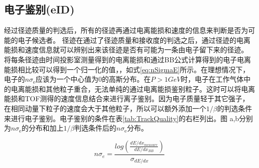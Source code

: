 \subsection{电子鉴别(eID)}
\label{ch:eID}
经过径迹质量的判选后，所有的径迹再通过电离能损和速度的信息来判断是否为可能的电子候选者。
径迹在通过了径迹质量和接收度的判选之后，通过径迹的电离能损和速度信息就可以辨别出来该径迹是否有可能为一条由电子留下来的径迹。
将每条径迹由时间投影室测量得到的电离能损和通过BB公式计算得到的电子电离能损相比较可以得到一个归一化的值，\nSigmaE ，如式\ref{eq:nSigmaE}所示。在理想情况下，电子的$n\sigma_\mathrm{e}$应该为一个中心值为0的高斯分布。在$P > 1 GeV$时，电子在工作气体中的电离能损和其他粒子重合，无法单纯的通过电离能损鉴别粒子。这时可以将电离能损和TOF测得的速度信息结合来进行离子鉴别。因为电子质量轻于其它强子，在相同动量下粒子的速度会大于其他粒子，所以可以额外添加一个$1/\beta$的判选条件来进行电子鉴别。电子鉴别的条件在表\ref{tab:TrackQuality}的右栏列出。图 a,b分别为$n\sigma_\mathrm{e}$的分布和加上$1/\beta$判选条件后的$n\sigma_\mathrm{e}$分布。

\begin{equation}
    \label{eq:nSigmaE}
    n\sigma_e = \frac{log(\frac{dE/dx_{measure}}{dE/dx_{BB}})}{\sigma_{dE/dx}}
\end{equation}

